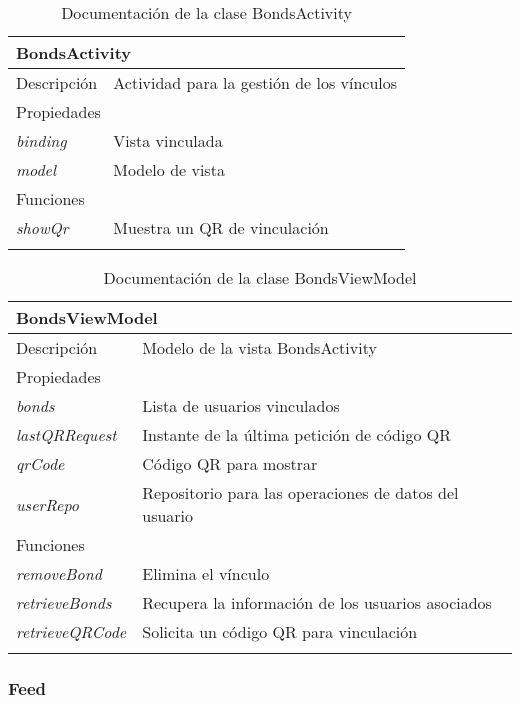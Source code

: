 \begin{longtable}{|p{} p{}|}
    \hline
    \multicolumn{2}{|l|}{\textbf{BondsActivity}} \\ \hline \hline
    Descripción      & Actividad para la gestión de los vínculos \\ \hline
    \multicolumn{2}{|l|}{Propiedades} \\
    \emph{binding}  & Vista vinculada  \\
    \emph{model}  & Modelo de vista  \\ \hline
    \multicolumn{2}{|l|}{Funciones} \\
    \emph{showQr}  & Muestra un QR de vinculación \\ \hline
    \caption{Documentación de la clase BondsActivity}
    \label{dis:app:bonds_activity}
\end{longtable}

\vspace{-25pt}
\begin{longtable}{|p{} p{}|}
    \hline
    \multicolumn{2}{|l|}{\textbf{BondsViewModel}} \\ \hline \hline
    Descripción      & Modelo de la vista BondsActivity \\ \hline
    \multicolumn{2}{|l|}{Propiedades} \\
    \emph{bonds}  & Lista de usuarios vinculados \\
    \emph{lastQRRequest}  & Instante de la última petición de código QR  \\ 
    \emph{qrCode}  & Código QR para mostrar  \\
    \emph{userRepo}  & Repositorio para las operaciones de datos del usuario  \\ \hline
    \multicolumn{2}{|l|}{Funciones} \\
    \emph{removeBond} & Elimina el vínculo \\
    \emph{retrieveBonds}  & Recupera la información de los usuarios asociados \\
    \emph{retrieveQRCode}  & Solicita un código QR para vinculación \\ \hline
    \caption{Documentación de la clase BondsViewModel}
    \label{dis:app:bonds_view_model}
\end{longtable}

\vspace{-30pt}
\subsubsection{Feed}

